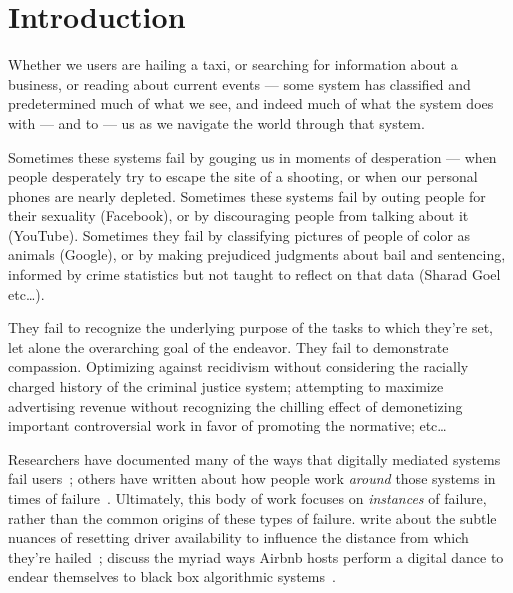 \documentclass[main]{subfiles}
\begin{document}
\section{Introduction}\label{sec:introduction}

Whether we users are hailing a taxi,
or searching for information about a business, 
or reading about current events ---
some system has classified and predetermined much of what we see, and
indeed much of what the system does with --- and to --- us as we navigate the world through that system.

Sometimes these systems fail by gouging us in moments of desperation ---
when people desperately try to escape the site of a shooting, 
or when our personal phones are nearly depleted.
Sometimes these systems fail by outing people for their sexuality (Facebook),
or by discouraging people from talking about it (YouTube).
Sometimes they fail by classifying pictures of people of color as animals (Google),
or by making prejudiced judgments about bail and sentencing,
informed by crime statistics but not taught to reflect on that data (Sharad Goel etc\dots).

They fail to recognize the underlying purpose of the tasks to which they're set,
let alone the overarching goal of the endeavor.
They fail to demonstrate compassion.
Optimizing against recidivism without considering the racially charged history of the criminal justice system;
attempting to maximize advertising revenue without recognizing the chilling effect of demonetizing important controversial work in favor of promoting the normative;
etc\dots

Researchers have documented many of the ways that digitally mediated systems fail users~\cite{takingAHITMcInnis,turkopticon,crowdcollab};
others have written about how people work \textit{around} those systems in times of failure~\cite{uberAlgorithm,irani2015cultural,Jhaver:2018:AAC:3173574.3173995}.
Ultimately, this body of work focuses on \textit{instances} of failure, rather than the common origins of these types of failure.
\citeauthor{uberAlgorithm} write about the subtle nuances of resetting driver availability to influence the distance from which they're hailed~\cite{uberAlgorithm};
\citeauthor{Jhaver:2018:AAC:3173574.3173995} discuss the myriad ways Airbnb hosts perform a digital dance to endear themselves to black box algorithmic systems~\cite{Jhaver:2018:AAC:3173574.3173995}.
\end{document}
